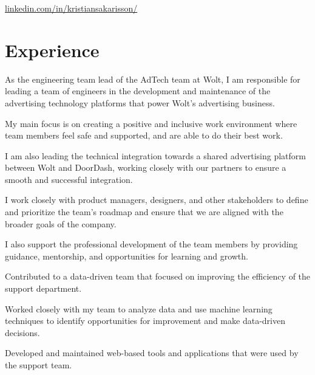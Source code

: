 \documentclass[]{deedy-resume-openfont}
\begin{document}

\href{https://www.linkedin.com/in/kristiansakarisson/}{linkedin.com/in/kristiansakarisson/}

\section{Experience}

\begin{tightemize}
\item As the engineering team lead of the AdTech team at Wolt, I am responsible for leading a team of engineers in the development and maintenance of the advertising technology platforms that power Wolt's advertising business.
\item My main focus is on creating a positive and inclusive work environment where team members feel safe and supported, and are able to do their best work.
\item I am also leading the technical integration towards a shared advertising platform between Wolt and DoorDash, working closely with our partners to ensure a smooth and successful integration.
\item I work closely with product managers, designers, and other stakeholders to define and prioritize the team's roadmap and ensure that we are aligned with the broader goals of the company.
\item I also support the professional development of the team members by providing guidance, mentorship, and opportunities for learning and growth.
\end{tightemize}

\sectionsep

\begin{tightemize}
\item Contributed to a data-driven team that focused on improving the efficiency of the support department.
\item Worked closely with my team to analyze data and use machine learning techniques to identify opportunities for improvement and make data-driven decisions.
\item Developed and maintained web-based tools and applications that were used by the support team.
\end{tightemize}
\end{document}

